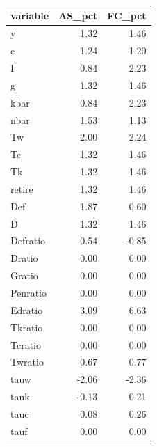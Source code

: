 \begin{tabular}{lrr}
  \hline
variable & AS\_pct & FC\_pct \\ 
  \hline
y & 1.32 & 1.46 \\ 
  c & 1.24 & 1.20 \\ 
  I & 0.84 & 2.23 \\ 
  g & 1.32 & 1.46 \\ 
  kbar & 0.84 & 2.23 \\ 
  nbar & 1.53 & 1.13 \\ 
  Tw & 2.00 & 2.24 \\ 
  Tc & 1.32 & 1.46 \\ 
  Tk & 1.32 & 1.46 \\ 
  retire & 1.32 & 1.46 \\ 
  Def & 1.87 & 0.60 \\ 
  D & 1.32 & 1.46 \\ 
  Defratio & 0.54 & -0.85 \\ 
  Dratio & 0.00 & 0.00 \\ 
  Gratio & 0.00 & 0.00 \\ 
  Penratio & 0.00 & 0.00 \\ 
  Edratio & 3.09 & 6.63 \\ 
  Tkratio & 0.00 & 0.00 \\ 
  Tcratio & 0.00 & 0.00 \\ 
  Twratio & 0.67 & 0.77 \\ 
  tauw & -2.06 & -2.36 \\ 
  tauk & -0.13 & 0.21 \\ 
  tauc & 0.08 & 0.26 \\ 
  tauf & 0.00 & 0.00 \\ 
   \hline
\end{tabular}
